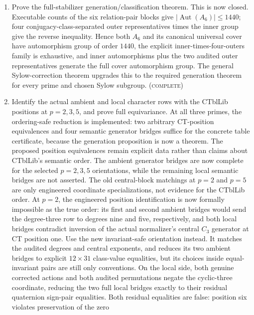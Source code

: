 \documentclass[11pt]{article}
\newcommand{\done}{\textcolor{donegreen}{\textsc{complete}}}
\begin{document}
\begin{enumerate}[label=\textbf{P2.A6.\arabic*.},leftmargin=*]
  \item Prove the full-stabilizer generation/classification theorem.
  This is now closed.  Executable counts of the six relation-pair blocks
  give
  \(\lvert\operatorname{Aut}(A_6)\rvert\leq 1440\); four
  conjugacy-class-separated outer representatives times the inner group
  give the reverse inequality.  Hence both \(A_6\) and its canonical
  universal cover have automorphism group of order \(1440\), the explicit
  inner-times-four-outers family is exhaustive, and inner automorphisms
  plus the two audited outer representatives generate the full cover
  automorphism group.  The general Sylow-correction theorem upgrades this
  to the required  generation theorem for every
  prime and chosen Sylow subgroup.  (\done)
  \item Identify the actual ambient and local character rows with the
  CTblLib positions at \(p=2,3,5\), and prove full
   equivariance.  At all three primes, the
  ordering-safe reduction is implemented: two arbitrary CT-position
  equivalences and four semantic generator bridges suffice for the
  concrete table certificate, because the generation proposition is now a
  theorem.  The proposed position equivalences remain explicit data rather
  than claims about CTblLib's semantic order.  The ambient generator bridges
  are now complete for the selected \(p=2,3,5\) orientations, while the
  remaining local semantic bridges are not asserted.
  The old central-block matchings at \(p=2\) and \(p=5\) are only
  engineered coordinate specializations, not evidence for the CTblLib
  order.
  At \(p=2\), the engineered position identification is now formally
  impossible as the true order: its first and second ambient bridges would
  send the degree-three row to degrees nine and five, respectively, and
  both local bridges contradict inversion of the actual normalizer's
  central \(C_3\) generator at CT position one.  Use
  the new invariant-safe orientation instead.  It matches the audited
  degrees and central exponents, and reduces its two ambient bridges to
  explicit \(12\times31\) class-value equalities, but its choices inside
  equal-invariant pairs are still only conventions.  On the local side,
  both genuine corrected actions and both audited permutations negate the
  cyclic-three coordinate, reducing the two full local bridges exactly to
  their residual quaternion sign-pair equalities.  Both residual
  equalities are false: position six violates preservation of the zero

\end{enumerate}
\end{document}
